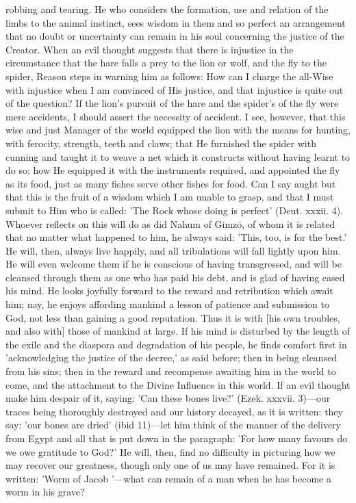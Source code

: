 \documentclass[12pt]{article}
\begin{document}
robbing and tearing. He who considers the formation, use and relation of the limbs to the animal instinct, sees wisdom in them and so perfect an arrangement that no doubt or uncertainty can remain in his soul concerning the justice of the Creator. When an evil thought suggests that there is injustice in the circumstance that the hare falls a prey to the lion or wolf, and the fly to the spider, Reason steps in warning him as follows: How can I charge the all-Wise with injustice when I am convinced of His justice, and that injustice is quite out of the question? If the lion's pursuit of the hare and the spider's of the fly were mere accidents, I should assert the necessity of accident. I see, however, that this wise and just Manager of the world equipped the lion with the means for hunting, with ferocity, strength, teeth and claws; that He furnished the spider with cunning and taught it to weave a net which it constructs without having learnt to do so; how He equipped it with the instruments required, and appointed the fly as its food, just as many fishes serve other fishes for food. Can I say aught but that this is the fruit of a wisdom which I am unable to grasp, and that I must submit to Him who is called: 'The Rock whose doing is perfect' (Deut. xxxii. 4). Whoever reflects on this will do as did Nahum of Gimzō, of whom it is related that no matter what happened to him, he always said: 'This, too, is for the best.' He will, then, always live happily, and all tribulations will fall lightly upon him. He will even welcome them if he is conscious of having transgressed, and will be cleansed through them as one who has paid his debt, and is glad of having eased his mind. He looks joyfully forward to the reward and retribution which await him; nay, he enjoys affording mankind a lesson of patience and submission to God, not less than gaining a good reputation. Thus it is with [his own troubles, and also with] those of mankind at large. If his mind is disturbed by the length of the exile and the diaspora and degradation of his people, he finds comfort first in 'acknowledging the justice of the decree,' as said before; then in being cleansed from his sins; then in the reward and recompense awaiting him in the world to come, and the attachment to the Divine Influence in this world. If an evil thought make him despair of it, saying: 'Can these bones live?' (Ezek. xxxvii. 3)---our traces being thoroughly destroyed and our history decayed, as it is written: they say: 'our bones are dried' (ibid 11)---let him think of the manner of the delivery from Egypt and all that is put down in the paragraph: 'For how many favours do we owe gratitude to God?' He will, then, find no difficulty in picturing how we may recover our greatness, though only one of us may have remained. For it is written: 'Worm of Jacob '---what can remain of a man when he has become a worm in his grave?
\end{document}

